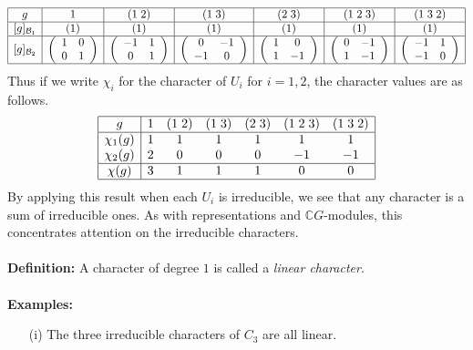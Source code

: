 {$$
\begin{array}{|c|c|c|c|c|c|c|}
\hline
g&1&(1\;2)&(1\;3)&(2\;3)&(1\;2\;3)&(1\;3\;2)\\
\hline
[g]_{{\cal B}_1}&(1)&(1)&(1)&(1)&(1)&(1)\\
\hline
[g]_{{\cal B}_2}&
\left(\begin{array}{cc}1&0\\0&1\end{array}\right)&
\left(\begin{array}{cc}-1&1\\0&1\end{array}\right)&
\left(\begin{array}{cc}0&-1\\-1&0\end{array}\right)&
\left(\begin{array}{cc}1&0\\1&-1\end{array}\right)&
\left(\begin{array}{cc}0&-1\\1&-1\end{array}\right)&
\left(\begin{array}{cc}-1&1\\-1&0\end{array}\right)\\
\hline
\end{array}
$$
Thus if we write $\chi_i$ for the
character of $U_i$ for $i=1,2$, the character values are as follows.
$$
\begin{array}{|c|cccccc|}
\hline
g&1&(1\;2)&(1\;3)&(2\;3)&(1\;2\;3)&(1\;3\;2)\\
\hline
\chi_1(g)&1&1&1&1&1&1\\
\chi_2(g)&2&0&0&0&-1&-1\\
\hline
\chi(g)&3&1&1&1&0&0\\
\hline
\end{array}
$$
By applying this result when each $U_i$ is irreducible, we see that any
character is a sum of irreducible ones. As with representations and
${\mathbb C}G$-modules, this concentrates attention on the irreducible characters.
\\
\\
{\bf Definition:} A character of degree $1$ is called a \emph{linear
character}.
\\
\\
{\bf Examples:}
\begin{itemize}
\item[(i)] The three irreducible characters of $C_3$ are all linear.

\end{itemize}}

